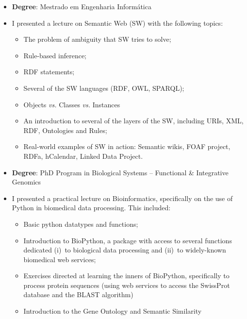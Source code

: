 \begin{itemize}
    \item \textbf{Degree}: Mestrado em Engenharia Informática
    \item I presented a lecture on Semantic Web (SW) with the following topics:
    \begin{itemize}
        \item The problem of ambiguity that SW tries to solve;
        \item Rule-based inference;
        \item RDF statements;
        \item Several of the SW languages (RDF, OWL, SPARQL);
        \item Objects \emph{vs.} Classes \emph{vs.} Instances
        \item An introduction to several of the layers of the SW, including URIs, XML, RDF, Ontologies and Rules;
        \item Real-world examples of SW in action: Semantic wikis, FOAF project, RDFa, hCalendar, Linked Data Project.
    \end{itemize}
\end{itemize}

\begin{itemize}
    \item \textbf{Degree}: PhD Program in Biological Systems -- Functional \& Integrative Genomics
    \item I presented a practical lecture on Bioinformatics, specifically on the use of Python in biomedical data processing. This included:
    \begin{itemize}
        \item Basic python datatypes and functions;
        \item Introduction to BioPython, a package with access to several functions dedicated (i)~to biological data processing and (ii)~to widely-known biomedical web services;
        \item Exercises directed at learning the inners of BioPython, specifically to process protein sequences (using web services to access the SwissProt database and the BLAST algorithm)
        \item Introduction to the Gene Ontology and Semantic Similarity
    \end{itemize}
\end{itemize}

